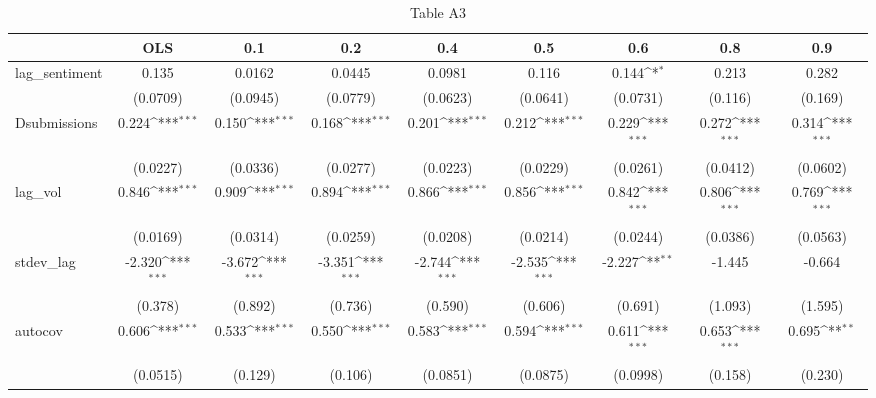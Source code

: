 \begin{table}[htbp]\centering
\def\sym#1{\ifmmode^{#1}\else\(^{#1}\)\fi}
\caption{Table A3}
\begin{tabular}{l*{8}{c}}
\toprule
                &\multicolumn{1}{c}{OLS}&\multicolumn{1}{c}{0.1}&\multicolumn{1}{c}{0.2}&\multicolumn{1}{c}{0.4}&\multicolumn{1}{c}{0.5}&\multicolumn{1}{c}{0.6}&\multicolumn{1}{c}{0.8}&\multicolumn{1}{c}{0.9}\\
\midrule
lag\_sentiment   &    0.135         &   0.0162         &   0.0445         &   0.0981         &    0.116         &    0.144\sym{*}  &    0.213         &    0.282         \\
                & (0.0709)         & (0.0945)         & (0.0779)         & (0.0623)         & (0.0641)         & (0.0731)         &  (0.116)         &  (0.169)         \\
\addlinespace
Dsubmissions    &    0.224\sym{***}&    0.150\sym{***}&    0.168\sym{***}&    0.201\sym{***}&    0.212\sym{***}&    0.229\sym{***}&    0.272\sym{***}&    0.314\sym{***}\\
                & (0.0227)         & (0.0336)         & (0.0277)         & (0.0223)         & (0.0229)         & (0.0261)         & (0.0412)         & (0.0602)         \\
\addlinespace
lag\_vol         &    0.846\sym{***}&    0.909\sym{***}&    0.894\sym{***}&    0.866\sym{***}&    0.856\sym{***}&    0.842\sym{***}&    0.806\sym{***}&    0.769\sym{***}\\
                & (0.0169)         & (0.0314)         & (0.0259)         & (0.0208)         & (0.0214)         & (0.0244)         & (0.0386)         & (0.0563)         \\
\addlinespace
stdev\_lag       &   -2.320\sym{***}&   -3.672\sym{***}&   -3.351\sym{***}&   -2.744\sym{***}&   -2.535\sym{***}&   -2.227\sym{**} &   -1.445         &   -0.664         \\
                &  (0.378)         &  (0.892)         &  (0.736)         &  (0.590)         &  (0.606)         &  (0.691)         &  (1.093)         &  (1.595)         \\
\addlinespace
autocov         &    0.606\sym{***}&    0.533\sym{***}&    0.550\sym{***}&    0.583\sym{***}&    0.594\sym{***}&    0.611\sym{***}&    0.653\sym{***}&    0.695\sym{**} \\
                & (0.0515)         &  (0.129)         &  (0.106)         & (0.0851)         & (0.0875)         & (0.0998)         &  (0.158)         &  (0.230)         \\

\end{tabular}
\end{table}
